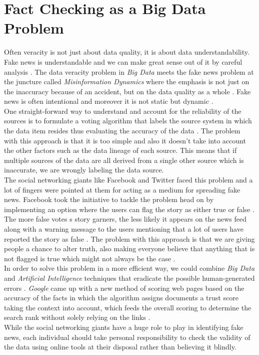 \documentclass[sigconf]{acmart}
\begin{document}
\section{Fact Checking as a Big Data Problem}
Often veracity is not just about data quality, it is about data understandability. Fake news is understandable and we can make great sense out of it by careful analysis \cite{www-forbes2}. The data veracity problem in {\em Big Data} meets the fake news problem at the juncture called {\em Misinformation Dynamics} where the emphasis is not just on the inaccuracy because of an accident, but on the data quality as a whole \cite{www-forbes2}. Fake news is often intentional and moreover it is not static but dynamic \cite{www-forbes2}.  \\
One straight-forward way to understand and account for the reliability of the sources is to formulate a voting algorithm that labels the source system in which the data item resides thus evaluating the accuracy of the data \cite{www-forbes1}. The problem with this approach is that it is too simple and also it doesn't take into account the other factors such as the data lineage of each source. This means that if multiple sources of the data are all derived from a single other source which is inaccurate, we are wrongly labeling the data source. \\ 
The social networking giants like Facebook and Twitter faced this problem and a lot of fingers were pointed at them for acting as a medium for spreading fake news. Facebook took the initiative to tackle the problem head on by implementing an option where the users can flag the story as either true or false \cite{www-forbes2}. The more false votes s story garners, the less likely it appears on the news feed along with a warning message to the users mentioning that a lot of users have reported the story as false \cite{www-forbes2}. The problem with this approach is that we are giving people a chance to alter truth, also making everyone believe that anything that is not flagged is true which might not always be the case \cite{www-forbes2} . \\ 
In order to solve this problem in a more efficient way, we could combine {\em Big Data} and {\em Artificial Intelligence} techniques that eradicate the possible human-generated errors \cite{www-forbes2}. {\em Google} came up with a new method of scoring web pages based on the accuracy of the facts in which the algorithm assigns documents a trust score taking the context into account, which feeds the overall scoring to determine the search rank without solely relying on the links \cite{www-forbes2}. \\
While the social networking giants have a huge role to play in identifying fake news, each individual should take personal responsibility to check the validity of the data using online tools at their disposal rather than believing it blindly. 
\end{document}
